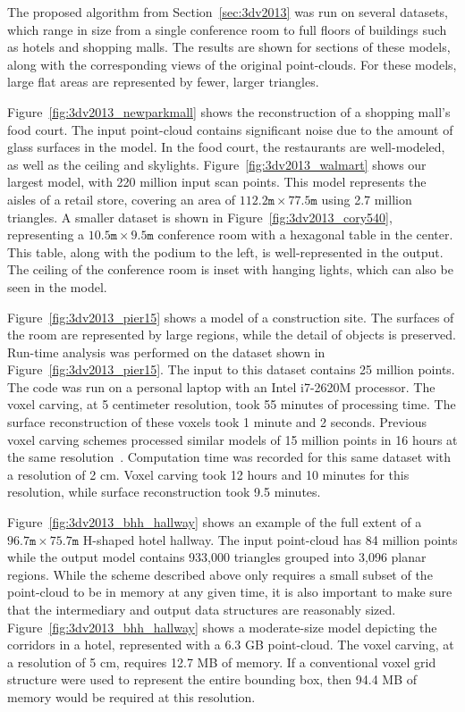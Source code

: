 \documentclass[12pt,onecolumn,oneside]{book}
\begin{document}
The proposed algorithm from Section~\ref{sec:3dv2013} was run on several datasets, which range in size from a single conference room to full floors of buildings such as hotels and shopping malls.  The results are shown for sections of these models, along with the corresponding views of the original point-clouds.  For these models, large flat areas are represented by fewer, larger triangles.

Figure~\ref{fig:3dv2013_newparkmall} shows the reconstruction of a shopping mall's food court.  The input point-cloud contains significant noise due to the amount of glass surfaces in the model.  In the food court, the restaurants are well-modeled, as well as the ceiling and skylights.  Figure~\ref{fig:3dv2013_walmart} shows our largest model, with 220 million input scan points.  This model represents the aisles of a retail store, covering an area of $112.2\texttt{m} \times 77.5\texttt{m}$ using 2.7 million triangles.  A smaller dataset is shown in Figure~\ref{fig:3dv2013_cory540}, representing a $10.5\texttt{m} \times 9.5\texttt{m}$ conference room with a hexagonal table in the center.  This table, along with the podium to the left, is well-represented in the output.  The ceiling of the conference room is inset with hanging lights, which can also be seen in the model.  

Figure~\ref{fig:3dv2013_pier15} shows a model of a construction site.  The surfaces of the room are represented by large regions, while the detail of objects is preserved.  Run-time analysis was performed on the dataset shown in Figure~\ref{fig:3dv2013_pier15}.  The input to this dataset contains 25 million points.  The code was run on a personal laptop with an Intel i7-2620M processor.  The voxel carving, at 5 centimeter resolution, took 55 minutes of processing time.  The surface reconstruction of these voxels took 1 minute and 2 seconds.  Previous voxel carving schemes processed similar models of 15 million points in 16 hours at the same resolution~\cite{Carving}.  Computation time was recorded for this same dataset with a resolution of 2 cm.  Voxel carving took 12 hours and 10 minutes for this resolution, while surface reconstruction took 9.5 minutes.

Figure~\ref{fig:3dv2013_bhh_hallway} shows an example of the full extent of a $96.7\texttt{m} \times 75.7\texttt{m}$ H-shaped hotel hallway.  The input point-cloud has 84 million points while the output model contains 933,000 triangles grouped into 3,096 planar regions.  While the scheme described above only requires a small subset of the point-cloud to be in memory at any given time, it is also important to make sure that the intermediary and output data structures are reasonably sized.  Figure~\ref{fig:3dv2013_bhh_hallway} shows a moderate-size model depicting the corridors in a hotel, represented with a 6.3 GB point-cloud.  The voxel carving, at a resolution of 5 cm, requires 12.7 MB of memory.  If a conventional voxel grid structure were used to represent the entire bounding box, then 94.4 MB of memory would be required at this resolution.
\end{document}
